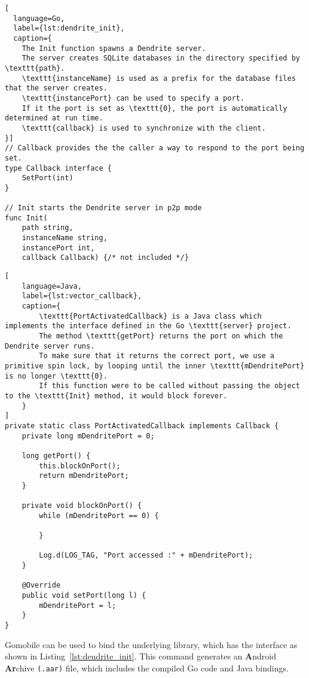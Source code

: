 \begin{lstfloat}
	\begin{lstlisting}[
  language=Go,
  label={lst:dendrite_init},
  caption={
    The Init function spawns a Dendrite server.
    The server creates SQLite databases in the directory specified by \texttt{path}.
    \texttt{instanceName} is used as a prefix for the database files that the server creates.
    \texttt{instancePort} can be used to specify a port.
    If it the port is set as \texttt{0}, the port is automatically determined at run time.
    \texttt{callback} is used to synchronize with the client.
}]
// Callback provides the the caller a way to respond to the port being set.
type Callback interface {
	SetPort(int)
}

// Init starts the Dendrite server in p2p mode
func Init(
    path string, 
    instanceName string, 
    instancePort int, 
    callback Callback) {/* not included */}
\end{lstlisting}
\end{lstfloat}


\begin{lstfloat}
	\begin{lstlisting}[
    language=Java,
    label={lst:vector_callback},
    caption={
        \texttt{PortActivatedCallback} is a Java class which implements the interface defined in the Go \texttt{server} project.
        The method \texttt{getPort} returns the port on which the Dendrite server runs.
        To make sure that it returns the correct port, we use a primitive spin lock, by looping until the inner \texttt{mDendritePort} is no longer \texttt{0}.
        If this function were to be called without passing the object to the \texttt{Init} method, it would block forever.
    }
]
private static class PortActivatedCallback implements Callback {
    private long mDendritePort = 0;

    long getPort() {
        this.blockOnPort();
        return mDendritePort;
    }

    private void blockOnPort() {
        while (mDendritePort == 0) {

        }

        Log.d(LOG_TAG, "Port accessed :" + mDendritePort);
    }

    @Override
    public void setPort(long l) {
        mDendritePort = l;
    }
}
\end{lstlisting}
\end{lstfloat}

Gomobile can be used to bind the underlying library, which has the interface as shown in Listing~\ref{lst:dendrite_init}.
This command generates an \textbf{A}ndroid \textbf{Ar}chive \texttt{(.aar)} file\cite{android_devdocs_aar}, which includes the compiled Go code and Java bindings.

